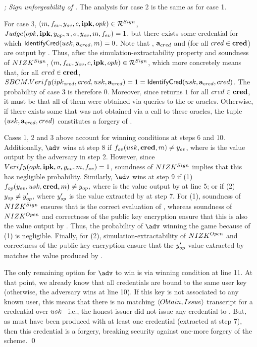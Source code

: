 \begin{proof}[; Sign unforgeability of \CUASGen]
  The analysis for case 2 is the same as for case 1.

  For case 3, $(m,f_{ev},y_{ev},c,\mathbf{ipk},opk) \in \mathcal{R}^{Sign}$,
  $Judge(opk,\mathbf{ipk},y_{op},\pi,\sigma,y_{ev},m,f_{ev})
  = 1$, but there exists some credential \cred for which $\mathsf{IdentifyCred}(usk,
  \mathbf{a}_{cred},m)=0$. Note that \usk, $\mathbf{a}_{cred}$ and \cred (for all
  $cred \in \mathbf{cred}$) are output by \ExtractSign. Thus, after the
  simulation-extractability property and soundness of $NIZK^{Sign}$, $(m,
  f_{ev},y_{ev},c,\mathbf{ipk},opk) \in \mathcal{R}^{Sign}$, which more concretely
  means that, for all $cred \in \mathbf{cred}$, $SBCM.Verify(ipk_{cred},cred,usk,
  \mathbf{a}_{cred}) = 1 = \mathsf{IdentifyCred}(usk,\mathbf{a}_{cred},cred)$. The
  probability of case 3 is therefore $0$.
  Moreover, since \SBCMVerify returns $1$ for all $cred \in \mathbf{cred}$, it must
  be that all of them were obtained via queries to the \ISSUE or \OBTISS
  oracles. Otherwise, if there exists some \cred that was not obtained via
  a call to these oracles, the tuple $(usk, \mathbf{a}_{cred}, cred)$ constitutes
  a forgery of \SBCM.

  Cases 1, 2 and 3 above account for winning conditions at steps 6 and 10.
  Additionally, $\adv$ wins at step 8 if $f_{ev}(usk,\mathbf{cred},m) \neq y_{ev}$,
  where \yeval is the value output by the adversary in step 2. However, since
  $Verify(opk,\mathbf{ipk},\sigma,y_{ev},m,f_{ev}) = 1$, soundness of $NIZK^{Sign}$
  implies that this has negligible probability.
  Similarly, $\adv$ wins at step 9 if (1) $f_{op}(y_{ev},usk,\mathbf{cred},m) \neq
  y_{op}$, where \yinsp is the value output by \Open at line 5; or if (2)
  $y_{op} \neq y_{op}'$, where $y_{op}'$ is the value extracted by \ExtractSign
  at step 7. For (1), soundness of $NIZK^{Sign}$ ensures that \yinsp is the
  correct evaluation of \finsp, whereas soundness of $NIZK^{Open}$ and
  correctness of the public key encryption ensure that this is also the value
  output by \Open. Thus, the probability of $\adv$ winning the game because
  of (1) is negligible. Finally, for (2), simulation-extractability of
  $NIZK^{Open}$ and correctness of the public key encryption ensure that
  the $y_{op}'$ value extracted by \NIZKExtract matches the value produced by
  \Open.

  The only remaining option for $\adv$ to win is via winning condition at line
  11. At that point, we already know that all credentials are bound to the same
  user key (otherwise, the adversary wins at line 10). If this key is not
  associated to any known user, this means that there is no matching $\langle
  Obtain,Issue\rangle$ transcript for a credential over $usk$ --i.e., the
  honest issuer did not issue any credential to \usk. But, as \sig must have
  been produced with at least one credential (extracted at step 7), then this
  credential is a forgery, breaking security against one-more forgery of the
  \SBCM scheme.  
  \qed
\end{proof}

